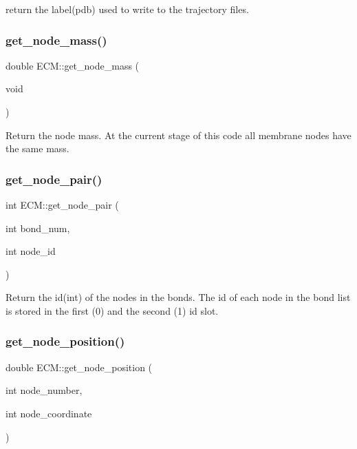 return the label(pdb) used to write to the trajectory files. \mbox{\label{classECM_a5ae07f6f6a367dc6ebac42387ad8edd2}} 
\subsubsection{\texorpdfstring{get\_node\_mass()}{get\_node\_mass()}}
{\footnotesize\ttfamily double E\+C\+M\+::get\+\_\+node\+\_\+mass (\begin{DoxyParamCaption}\item[{void}]{ }\end{DoxyParamCaption})\hspace{0.3cm}{\ttfamily [inline]}}

Return the node mass. At the current stage of this code all membrane nodes have the same mass. \mbox{\label{classECM_a97b1c4fbfa1158752369ed3e1c8f2f59}} 
\subsubsection{\texorpdfstring{get\_node\_pair()}{get\_node\_pair()}}
{\footnotesize\ttfamily int E\+C\+M\+::get\+\_\+node\+\_\+pair (\begin{DoxyParamCaption}\item[{int}]{bond\+\_\+num,  }\item[{int}]{node\+\_\+id }\end{DoxyParamCaption})\hspace{0.3cm}{\ttfamily [inline]}}

Return the id(int) of the nodes in the bonds. The id of each node in the bond list is stored in the first (0) and the second (1) id slot. \mbox{\label{classECM_a7c17fccf4d4f8165a7dceee20c81433d}} 
\subsubsection{\texorpdfstring{get\_node\_position()}{get\_node\_position()}}
{\footnotesize\ttfamily double E\+C\+M\+::get\+\_\+node\+\_\+position (\begin{DoxyParamCaption}\item[{int}]{node\+\_\+number,  }\item[{int}]{node\+\_\+coordinate }\end{DoxyParamCaption})\hspace{0.3cm}{\ttfamily [inline]}}

